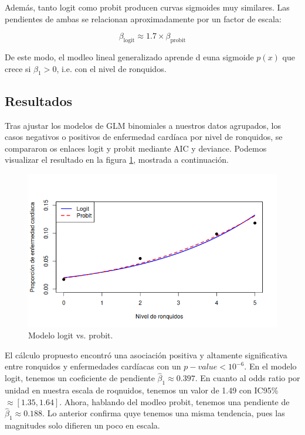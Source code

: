Además, tanto logit como probit producen curvas sigmoides muy similares. Las pendientes de ambas se
relacionan aproximadamente por un factor de escala:

\[
    \beta_{\text{logit}} \approx 1.7 \times \beta_{\text{probit}}
\]

De este modo, el modleo lineal generalizado aprende d euna sigmoide $p(x)$ que crece si $\beta_1 > 0$, 
i.e. con el nivel de ronquidos. 



\subsection{Resultados}

Tras ajustar los modelos de GLM binomiales a nuestros datos agrupados, los casos negativos o positivos
de enfermedad cardíaca por nivel de ronquidos, se compararon os enlaces logit y probit mediante AIC y 
deviance. Podemos visualizar el resultado en la figura \ref{fig:logit-probit-02}, mostrada a continuación.

\begin{figure}[h!]
    \centering
    \includegraphics[width=0.7\linewidth]{Images/logit-probit-p02.png}
    \caption{Modelo logit vs. probit.}
    \label{fig:logit-probit-02}
\end{figure}

El cálculo propuesto encontró una asociación positiva y altamente significativa entre ronquidos y enfermedades
cardíacas con un $p-value < 10^{-6}$. En el modelo logit, tenemos un coeficiente de pendiente $\hat{\beta}_1 \approx 0.397$.
En cuanto al odds ratio por unidad en nuestra escala de roqnuidos, tenemos un valor de 1.49 con IC95\% $\approx [1.35, 1.64]$. 
Ahora, hablando del modleo probit, tenemos una pendiente de $\hat{\beta}_1 \approx 0.188$. Lo anterior 
confirma quye tenemos una misma tendencia, pues las magnitudes solo difieren un poco en escala. 

